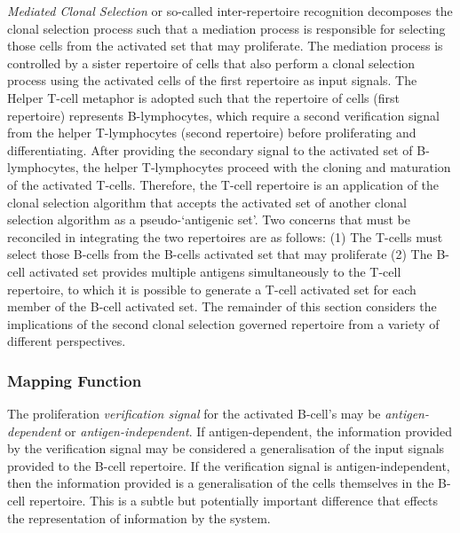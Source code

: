 \emph{Mediated Clonal Selection} or so-called inter-repertoire recognition decomposes the clonal selection process such that a mediation process is responsible for selecting those cells from the activated set that may proliferate. The mediation process is controlled by a sister repertoire of cells that also perform a clonal selection process using the activated cells of the first repertoire as input signals. The Helper T-cell metaphor is adopted such that the repertoire of cells (first repertoire) represents B-lymphocytes, which require a second verification signal from the helper T-lymphocytes (second repertoire) before proliferating and differentiating. After providing the secondary signal to the activated set of B-lymphocytes, the helper T-lymphocytes proceed with the cloning and maturation of the activated T-cells. Therefore, the T-cell repertoire is an application of the clonal selection algorithm that accepts the activated set of another clonal selection algorithm as a pseudo-`antigenic set'. Two concerns that must be reconciled in integrating the two repertoires are as follows: (1) The T-cells must select those B-cells from the B-cells activated set that may proliferate (2) The B-cell activated set provides multiple antigens simultaneously to the T-cell repertoire, to which it is possible to generate a T-cell activated set for each member of the B-cell activated set. The remainder of this section considers the implications of the second clonal selection governed repertoire from a variety of different perspectives.

% 
%
\subsubsection{Mapping Function}
The proliferation \emph{verification signal} for the activated B-cell's may be \emph{antigen-dependent} or \emph{antigen-independent}. If antigen-dependent, the information provided by the verification signal may be considered a generalisation of the input signals provided to the B-cell repertoire. If the verification signal is antigen-independent, then the information provided is a generalisation of the cells themselves in the B-cell repertoire. This is a subtle but potentially important difference that effects the representation of information by the system.

